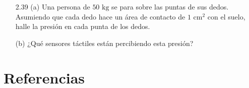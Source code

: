 \documentclass[12pt]{book}
\begin{document}
\begin{enumerate}
(c) Escriba el equilibrio de fuerzas y la ecuación de torque para cada uno de los segmentos.

(d) Para cada una de estas condiciones de equilibrio, sume las ecuaciones (como las ecuaciones de torque) para el muslo, la pantorrilla y el pie. Demuestre que las tres ecuaciones de equilibrio resultantes son las ecuaciones correctas para toda la pierna.

\subsection*{El sentido del tacto}

\item[2.39] (a) Una persona de $50\text{ kg}$ se para sobre las puntas de sus dedos. Asumiendo que cada dedo hace un área de contacto de $1\text{ cm}^2$ con el suelo, halle la presión en cada punta de los dedos.

(b) ¿Qué sensores táctiles están percibiendo esta presión?
\end{enumerate}

\section*{Referencias}
\end{document}
